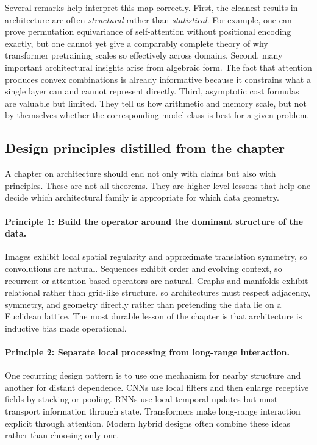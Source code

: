 Several remarks help interpret this map correctly.
First, the cleanest results in architecture are often \emph{structural} rather than \emph{statistical}.
For example, one can prove permutation equivariance of self-attention without positional encoding exactly, but one cannot yet give a comparably complete theory of why transformer pretraining scales so effectively across domains.
Second, many important architectural insights arise from algebraic form.
The fact that attention produces convex combinations is already informative because it constrains what a single layer can and cannot represent directly.
Third, asymptotic cost formulas are valuable but limited.
They tell us how arithmetic and memory scale, but not by themselves whether the corresponding model class is best for a given problem.

\subsection*{Design principles distilled from the chapter}

A chapter on architecture should end not only with claims but also with principles.
These are not all theorems.
They are higher-level lessons that help one decide which architectural family is appropriate for which data geometry.

\paragraph{Principle 1: Build the operator around the dominant structure of the data.}
Images exhibit local spatial regularity and approximate translation symmetry, so convolutions are natural.
Sequences exhibit order and evolving context, so recurrent or attention-based operators are natural.
Graphs and manifolds exhibit relational rather than grid-like structure, so architectures must respect adjacency, symmetry, and geometry directly rather than pretending the data lie on a Euclidean lattice.
The most durable lesson of the chapter is that architecture is inductive bias made operational.

\paragraph{Principle 2: Separate local processing from long-range interaction.}
One recurring design pattern is to use one mechanism for nearby structure and another for distant dependence.
CNNs use local filters and then enlarge receptive fields by stacking or pooling.
RNNs use local temporal updates but must transport information through state.
Transformers make long-range interaction explicit through attention.
Modern hybrid designs often combine these ideas rather than choosing only one.

